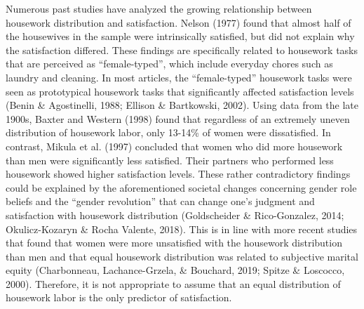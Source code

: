\documentclass[
  man,floatsintext]{apa6}
\begin{document}
Numerous past studies have analyzed the growing relationship between housework distribution and satisfaction. Nelson (1977) found that almost half of the housewives in the sample were intrinsically satisfied, but did not explain why the satisfaction differed. These findings are specifically related to housework tasks that are perceived as ``female-typed'', which include everyday chores such as laundry and cleaning. In most articles, the ``female-typed'' housework tasks were seen as prototypical housework tasks that significantly affected satisfaction levels (Benin \& Agostinelli, 1988; Ellison \& Bartkowski, 2002). Using data from the late 1900s, Baxter and Western (1998) found that regardless of an extremely uneven distribution of housework labor, only 13-14\% of women were dissatisfied. In contrast, Mikula et al. (1997) concluded that women who did more housework than men were significantly less satisfied. Their partners who performed less housework showed higher satisfaction levels.
These rather contradictory findings could be explained by the aforementioned societal changes concerning gender role beliefs and the ``gender revolution'' that can change one's judgment and satisfaction with housework distribution (Goldscheider \& Rico-Gonzalez, 2014; Okulicz-Kozaryn \& Rocha Valente, 2018). This is in line with more recent studies that found that women were more unsatisfied with the housework distribution than men and that equal housework distribution was related to subjective marital equity (Charbonneau, Lachance-Grzela, \& Bouchard, 2019; Spitze \& Loscocco, 2000). Therefore, it is not appropriate to assume that an equal distribution of housework labor is the only predictor of satisfaction.
\end{document}
